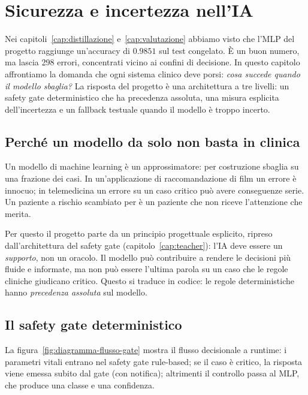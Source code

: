 
\chapter{Sicurezza e incertezza nell'IA}\label{cap:sicurezza}

Nei capitoli~\ref{cap:distillazione} e~\ref{cap:valutazione} abbiamo visto
che l'MLP del progetto \progetto{} raggiunge un'accuracy di $0.9851$ sul
test congelato. È un buon numero, ma lascia 298 errori, concentrati vicino
ai confini di decisione. In questo capitolo affrontiamo la domanda che
ogni sistema clinico deve porsi: \emph{cosa succede quando il modello
sbaglia?} La risposta del progetto è una architettura a tre livelli:
un safety gate deterministico che ha precedenza assoluta, una misura
esplicita dell'incertezza e un fallback testuale quando il modello è
troppo incerto.

\section{Perché un modello da solo non basta in clinica}\label{sec:perche-modello-non-basta}

Un modello di machine learning è un approssimatore: per costruzione sbaglia
su una frazione dei casi. In un'applicazione di raccomandazione di film un
errore è innocuo; in telemedicina un errore su un caso critico può avere
conseguenze serie. Un paziente a rischio  scambiato per
 è un paziente che non riceve l'attenzione che merita.

Per questo il progetto parte da un principio progettuale esplicito, ripreso
dall'architettura del safety gate (capitolo~\ref{cap:teacher}): l'IA deve
essere un \emph{supporto}, non un oracolo. Il modello può contribuire a
rendere le decisioni più fluide e informate, ma non può essere l'ultima
parola su un caso che le regole cliniche giudicano critico. Questo si
traduce in codice: le regole deterministiche hanno \emph{precedenza
assoluta} sul modello.

\section{Il safety gate deterministico}\label{sec:safety-gate}

La figura~\ref{fig:diagramma-flusso-gate} mostra il flusso decisionale a
runtime: i parametri vitali entrano nel safety gate rule-based; se il caso
è critico, la risposta viene emessa subito dal gate (con notifica); altrimenti
il controllo passa al MLP, che produce una classe e una confidenza.

